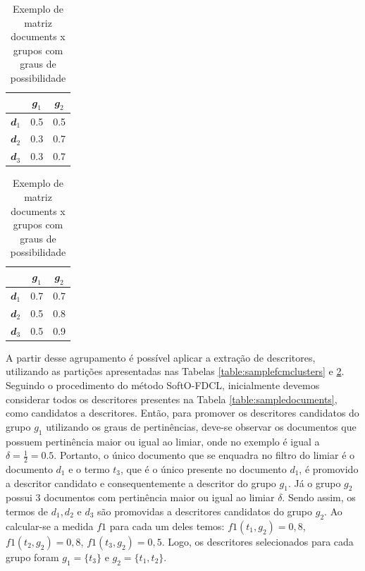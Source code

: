 \begin{table}[!htp]
  \begin{minipage}{0.45\textwidth} 
    \centering
    \begin{tabular}{ |c|c|c|}
      \hline
      & $\mathbfit{g_1}$ & $\mathbfit{g_2}$ \\
      \hline
      $\mathbfit{d_1}$ & 0.5 & 0.5 \\
      \hline
      $\mathbfit{d_2}$ & 0.3 & 0.7 \\
      \hline
      $\mathbfit{d_3}$ & 0.3 & 0.7 \\
      \hline
    \end{tabular}
    \caption{Exemplo de matriz documents x grupos com graus de pertinência}
    \label{table:samplefcmclusters}
  \end{minipage}\hfill 
  \begin{minipage}{0.45\textwidth} 
    \centering
    \begin{tabular}{ |c|c|c|}
      \hline
      & $\mathbfit{g_1}$ & $\mathbfit{g_2}$ \\
      \hline
      $\mathbfit{d_1}$ & 0.7 & 0.7 \\
      \hline
      $\mathbfit{d_2}$ & 0.5 & 0.8 \\
      \hline
      $\mathbfit{d_3}$ & 0.5 & 0.9 \\
      \hline
    \end{tabular}
    \caption{Exemplo de matriz documents x grupos com graus de possibilidade}
    \label{table:samplepcmclusters}
  \end{minipage}\hfill 
\end{table}

A partir desse agrupamento é possível aplicar a extração de descritores, utilizando as partições
apresentadas nas Tabelas \ref{table:samplefcmclusters} e \ref{table:samplepcmclusters}. Seguindo
o procedimento do método SoftO-FDCL, inicialmente devemos considerar todos os descritores
presentes na Tabela \ref{table:sampledocuments}, como candidatos a descritores. Então, para
promover os descritores candidatos do grupo $g_1$ utilizando os graus de pertinências, deve-se 
observar os documentos que possuem pertinência maior ou igual ao limiar, onde no exemplo é
igual a $\delta = \frac{1}{2} = 0.5$. Portanto, o único documento que se enquadra no filtro do limiar
é o documento $d_1$ e o termo $t_3$, que é o único presente no documento $d_1$, é promovido
a descritor candidato e consequentemente a descritor do grupo $g_1$. Já o grupo $g_2$ possui 3
documentos com pertinência maior ou igual ao limiar $\delta$. Sendo assim, os termos de $d_1,d_2$ e
$d_3$ são promovidas a descritores candidatos do grupo $g_2$. Ao calcular-se a medida $f1$ para cada
um deles temos: $f1(t_1,g_2) = 0,8$, $f1(t_2,g_2) = 0,8$, $f1(t_3,g_2) = 0,5$. Logo, os descritores
selecionados para cada grupo foram $g_1 =\{t_3\}$ e $g_2 = \{t_1, t_2\}$.

